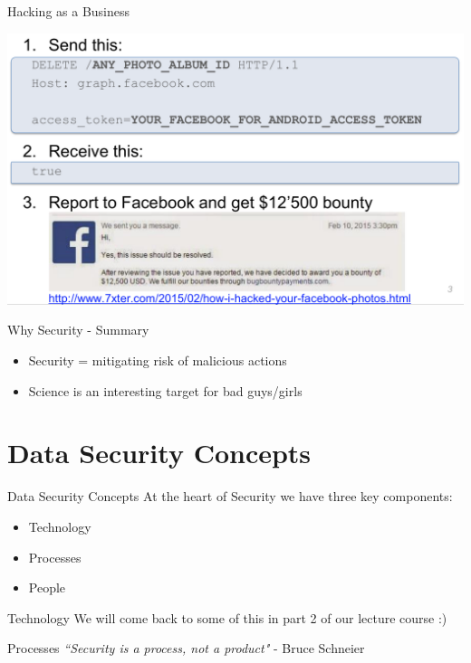 \documentclass{beamer}
\begin{document}
\begin{frame}{Hacking as a Business}
\begin{center}
\includegraphics[width=0.8\linewidth]{facebook-bounty.png}
\end{center}
\end{frame}

\begin{frame}{Why Security - Summary}
\begin{itemize}
\item Security = mitigating risk of malicious actions
\item Science is an interesting target for bad guys/girls
\end{itemize}
\end{frame}

\section{Data Security Concepts}
\frame{\sectionpage}

\begin{frame}{Data Security Concepts}
At the heart of Security we have three key components:
	\begin{itemize}
		\item Technology
		\item Processes
        \item People
	\end{itemize}
\end{frame}

\begin{frame}{Technology}
We will come back to some of this in part 2 of our lecture course :) 
\end{frame}

\begin{frame}{Processes}
\textit{``Security is a process, not a product"} - Bruce Schneier
\end{frame}
\end{document}
